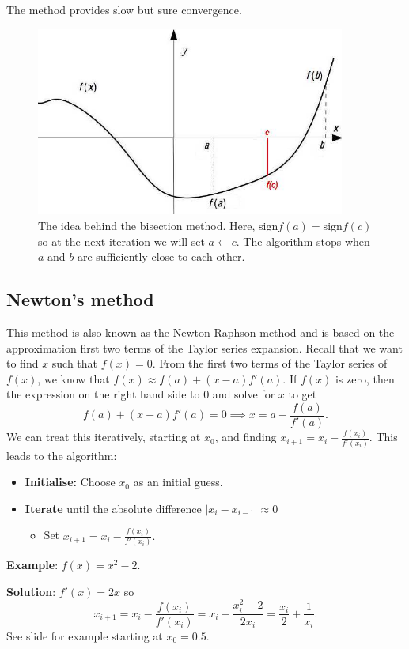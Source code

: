 The method provides slow but sure convergence.
\begin{figure}[htbp]
\includegraphics[width=4in]{figures/bisectionIdea.jpg}
\caption{The idea behind the bisection method. Here, $\mathrm{sign} f(a) =\mathrm{sign} f(c)$ so at the next iteration we will set $a \leftarrow c$. The algorithm stops when $a$ and $b$ are sufficiently close to each other.}
\end{figure}

\subsection{Newton's method}

This method is also known as the Newton-Raphson method and is based on the approximation first two terms of the Taylor series expansion.  Recall that we want to find $x$ such that $f(x) = 0$. From the first two terms of the  Taylor series of $f(x)$, we know that  $f(x)  \approx f(a) + (x - a) f'(a)$.  If $f(x)$ is zero, then the expression on the right hand side to 0 and solve for $x$ to get  
\[ f(a) + (x - a) f'(a) = 0 \implies  x = a - \frac{f(a)}{f'(a) }.\]
We can treat this iteratively, starting at $x_0$, and finding $x_{i+1} = x_i - \frac{f(x_i)}{f'(x_i) }$.  This leads to the algorithm:
\begin{itemize}
\item {\bf Initialise:} Choose $x_0$ as an initial guess.
\item {\bf Iterate} until the absolute difference $\vert x_i-x_{i-1} \vert \approx 0$
\begin{itemize} 
\item Set $x_{i+1} = x_i - \frac{f(x_i)}{f'(x_i) }.$
\end{itemize}
\end{itemize}

{\bf Example}: $f(x) = x^2 - 2$.

{\bf Solution}:  $f'(x) = 2x$ so 
\[
x_{i+1} =  x_i - \frac{f(x_i)}{f'(x_i) } = x_i - \frac{x_i^2 - 2}{2x_i} = \frac{x_i}2 + \frac1{x_i}.
 \]
See slide for example starting at $x_0 = 0.5$. \sqend


